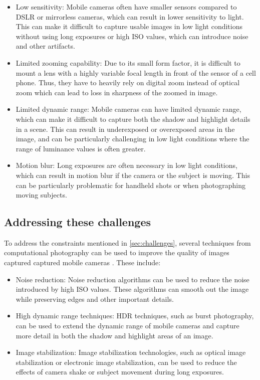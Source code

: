 \documentclass{egpubl}
\begin{document}
\begin{itemize}
    \item Low sensitivity: Mobile cameras often have smaller sensors compared 
          to DSLR or mirrorless cameras, which can result in lower sensitivity 
          to light. This can make it difficult to capture usable images in low 
          light conditions without using long exposures or high ISO values, 
          which can introduce noise and other artifacts.

    \item Limited zooming capability: Due to its small form factor, it is difficult to mount a lens 
          with a highly variable focal length in front of the sensor of a cell phone.
          Thus, they have to heavily rely on digital zoom instead of optical zoom which can lead to loss 
          in sharpness of the zoomed in image.
    
    \item Limited dynamic range: Mobile cameras can have limited dynamic range, 
          which can make it difficult to capture both the shadow and highlight 
          details in a scene. This can result in underexposed or overexposed 
          areas in the image, and can be particularly challenging in low light 
          conditions where the range of luminance values is often greater.
    
    \item Motion blur: Long exposures are often necessary in low light conditions, 
          which can result in motion blur if the camera or the subject is moving. 
          This can be particularly problematic for handheld shots or when photographing 
          moving subjects.
\end{itemize}

\subsection{Addressing these challenges}
To address the constraints mentioned in \cref{sec:challenges}, several techniques 
from computational photography can be used to improve the quality of images captured 
captured mobile cameras \cite{delbracio2021mobile}. These include:

\begin{itemize}
    \item Noise reduction: Noise reduction algorithms can be used to reduce the noise 
          introduced by high ISO values. These algorithms can smooth 
          out the image while preserving edges and other important details.

    \item High dynamic range techniques: HDR techniques, such as burst photography, can be used to extend the dynamic range of mobile 
          cameras and capture more detail in both the shadow and highlight areas of an image.
    
    \item Image stabilization: Image stabilization technologies, such as optical image 
          stabilization or electronic image stabilization, can be used to reduce the 
          effects of camera shake or subject movement during long exposures.
\end{itemize}
\end{document}
